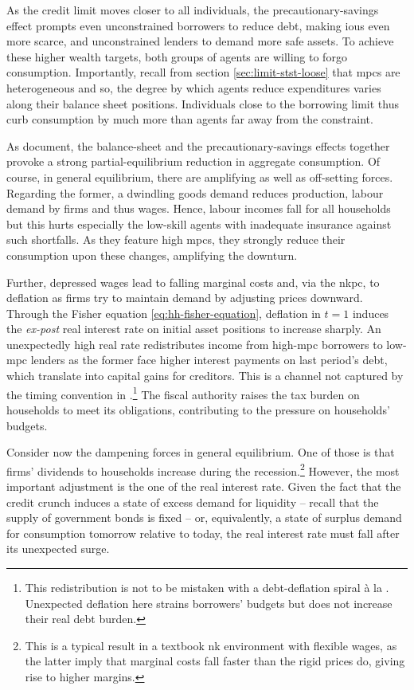\documentclass[a4paper,12pt]{article} %
\numberwithin{equation}{section} %
\numberwithin{figure}{section}
\numberwithin{table}{section}
\begin{document}
As the credit limit moves closer to all individuals, the precautionary-savings effect prompts even unconstrained borrowers to reduce debt, making \Gls{iou}s even more scarce, and unconstrained lenders to demand more safe assets. To achieve these higher wealth targets, both groups of agents are willing to forgo consumption. Importantly, recall from section \ref{sec:limit-stst-loose} that \Gls{mpc}s are heterogeneous and so, the degree by which agents reduce expenditures varies along their balance sheet positions. Individuals close to the borrowing limit thus curb consumption by much more than agents far away from the constraint.

As \textcite{gl2017} document, the balance-sheet and the precautionary-savings effects together provoke a strong partial-equilibrium reduction in aggregate consumption. Of course, in general equilibrium, there are amplifying as well as off-setting forces. Regarding the former, a dwindling goods demand reduces production, labour demand by firms and thus wages. Hence, labour incomes fall for all households but this hurts especially the low-skill agents with inadequate insurance against such shortfalls. As they feature high \Gls{mpc}s, they strongly reduce their consumption upon these changes, amplifying the downturn.

Further, depressed wages lead to falling marginal costs and, via the \Gls{nkpc}, to deflation as firms try to maintain demand by adjusting prices downward. Through the Fisher equation \eqref{eq:hh-fisher-equation}, deflation in $t=1$ induces the \textit{ex-post} real interest rate on initial asset positions to increase sharply. An unexpectedly high real rate redistributes income from high-\Gls{mpc} borrowers to low-\Gls{mpc} lenders as the former face higher interest payments on last period's debt, which translate into capital gains for creditors. This is a channel not captured by the timing convention in \textcite{gl2017}.\footnote{This redistribution is not to be mistaken with a debt-deflation spiral à la \textcite{fisher1933}. Unexpected deflation here strains borrowers' budgets but does not increase their real debt burden.} The fiscal authority raises the tax burden on households to meet its obligations, contributing to the pressure on households' budgets.

Consider now the dampening forces in general equilibrium. One of those is that firms' dividends to households increase during the recession.\footnote{This is a typical result in a textbook \Gls{nk} environment with flexible wages, as the latter imply that marginal costs fall faster than the rigid prices do, giving rise to higher margins.} However, the most important adjustment is the one of the real interest rate. Given the fact that the credit crunch induces a state of excess demand for liquidity -- recall that the supply of government bonds is fixed -- or, equivalently, a state of surplus demand for consumption tomorrow relative to today, the real interest rate must fall after its unexpected surge. 
\end{document}
